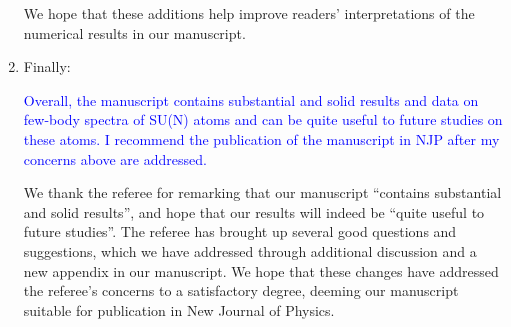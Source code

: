 \documentclass[preprint,showkeys,nofootinbib]{revtex4-1}
\newcommand{\1}{\mathds{1}}
\newcommand{\blue}[1]{\textcolor{blue}{#1}}
\begin{document}
\begin{enumerate}
  We hope that these additions help improve readers' interpretations
  of the numerical results in our manuscript.


\item Finally:

  \blue{Overall, the manuscript contains substantial and solid results
    and data on few-body spectra of SU(N) atoms and can be quite
    useful to future studies on these atoms. I recommend the
    publication of the manuscript in NJP after my concerns above are
    addressed.}

  We thank the referee for remarking that our manuscript ``contains
  substantial and solid results'', and hope that our results will
  indeed be ``quite useful to future studies''.  The referee has
  brought up several good questions and suggestions, which we have
  addressed through additional discussion and a new appendix in our
  manuscript.  We hope that these changes have addressed the referee's
  concerns to a satisfactory degree, deeming our manuscript suitable
  for publication in New Journal of Physics.

\end{enumerate}
\end{document}
